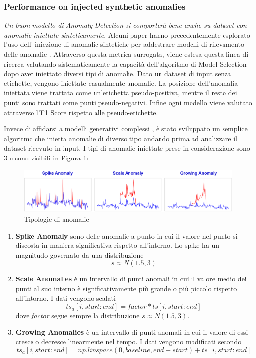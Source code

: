 \subsubsection{Performance on injected synthetic anomalies}
\textit{Un buon modello di Anomaly Detection si comporterà bene anche su dataset con anomalie iniettate sinteticamente}. Alcuni paper hanno precedentemente esplorato l'uso dell' iniezione di anomalie sintetiche per addestrare modelli di rilevamento delle anomalie \cite{DBLP:journals/corr/abs-2107-07702}. Attraverso questa metrica surrogata, viene estesa questa linea di ricerca valutando sistematicamente la capacità dell'algoritmo di Model Selection dopo aver iniettato diversi tipi di anomalie. Dato un dataset di input senza etichette, vengono iniettate casualmente anomalie. La posizione dell'anomalia iniettata viene trattata come un'etichetta pseudo-positiva, mentre il resto dei punti sono trattati come punti pseudo-negativi. 
Infine ogni modello viene valutato attraverso l'F1 Score rispetto alle pseudo-etichette.

Invece di affidarsi a modelli generativi complessi \cite{DBLP:journals/corr/abs-2002-12478}, è stato sviluppato un semplice algoritmo che inietta anomalie di diverso tipo andando prima ad analizzare il dataset ricevuto in input. I tipi di anomalie iniettate prese in considerazione sono 3 e sono visibili in Figura \ref{tipi-anomalie}: 
\begin{figure}[t]
	\centering
	\includegraphics[width=14cm, scale=1]{images/anomalies}
	\caption{Tipologie di anomalie}
	\label{tipi-anomalie}
		
\end{figure}


\begin{enumerate}
	\item \textbf{Spike Anomaly} sono delle anomalie a punto in cui il valore nel punto si discosta in maniera significativa rispetto all'intorno. Lo spike ha un magnitudo governato da una distribuzione \[s \approx N(1.5, 3) \]
	\item \textbf{Scale Anomalies} è un intervallo di punti anomali in cui il  valore medio dei punti al suo interno è significativamente più grande o più piccolo rispetto all'intorno. I dati vengono scalati \[ ts_a[i, start:end] = factor*ts[i, start:end]\] dove \textit{factor} segue sempre la distribuzione \(s \approx N(1.5, 3) \).
	\item \textbf{Growing Anomalies} è un intervallo di punti anomali in cui il valore di essi cresce o decresce linearmente nel tempo. I dati vengono modificati secondo \[ ts_a[i, start:end] = np.linspace(0, baseline, end-start) + ts[i, start:end] \] 
\end{enumerate}

